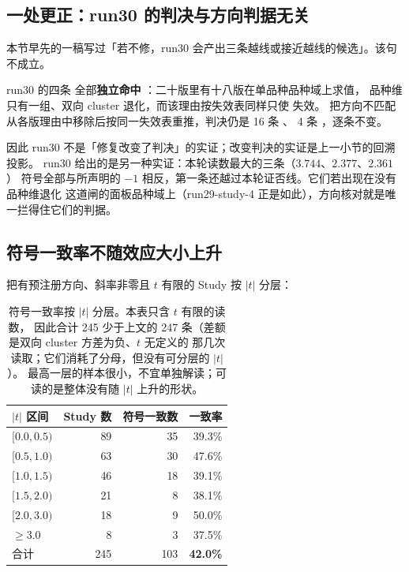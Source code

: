 \documentclass[11pt]{ctexart}
\begin{document}
\subsection{一处更正：run30 的判决与方向判据无关}
本节早先的一稿写过「若不修，run30 会产出三条越线或接近越线的候选」。该句不成立。

run30 的四条  全部\textbf{独立命中}
：二十版里有十八版在单品种品种域上求值，
品种维只有一组、双向 cluster 退化，而该理由按失效表同样只使  失效。
把方向不匹配从各版理由中移除后按同一失效表重推，判决仍是 16 条 、
4 条 ，逐条不变。

因此 run30 不是「修复改变了判决」的实证；改变判决的实证是上一小节的回溯投影。
run30 给出的是另一种实证：本轮读数最大的三条（$3.744$、$2.377$、$2.361$）
符号全部与所声明的 $-1$ 相反，第一条还越过本轮证否线。它们若出现在没有品种维退化
这道闸的面板品种域上（run29-study-4 正是如此），方向核对就是唯一拦得住它们的判据。

\subsection{符号一致率不随效应大小上升}
把有预注册方向、斜率非零且 $t$ 有限的 Study 按 $|t|$ 分层：

\begin{table}[htbp]\centering\footnotesize
\begin{tabular}{@{}>{\raggedright\arraybackslash}p{} r r r@{}}
\toprule
$|t|$ 区间 & Study 数 & 符号一致数 & 一致率 \\ \midrule
$[0.0,0.5)$ & 89 & 35 & 39.3\% \\
$[0.5,1.0)$ & 63 & 30 & 47.6\% \\
$[1.0,1.5)$ & 46 & 18 & 39.1\% \\
$[1.5,2.0)$ & 21 & 8 & 38.1\% \\
$[2.0,3.0)$ & 18 & 9 & 50.0\% \\
$\geq 3.0$ & 8 & 3 & 37.5\% \\
\midrule
合计 & 245 & 103 & \textbf{42.0\%} \\
\bottomrule\end{tabular}
\caption{符号一致率按 $|t|$ 分层。本表只含 $t$ 有限的读数，
因此合计 245 少于上文的 247 条（差额是双向 cluster 方差为负、$t$ 无定义的
那几次读取；它们消耗了分母，但没有可分层的 $|t|$）。
最高一层的样本很小，不宜单独解读；可读的是整体没有随 $|t|$ 上升的形状。}
\end{table}
\end{document}
